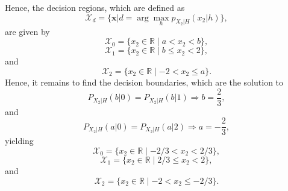 \begin{solution}
    Hence, the decision regions, which are defined as 
  \begin{equation*}
    \mathcal{X}_d = \{\mathbf{x} | d = \arg \mathop{\operatorname{max}}_{h} p_{X_2|H}(x_2|h)\},
  \end{equation*}
  are given by
        \begin{equation*}
          \mathcal{X}_0 = \{x_2 \in \mathbb{R}  \mid a < x_2 < b \},
        \end{equation*}
        \begin{equation*}
          \mathcal{X}_1 = \{x_2 \in \mathbb{R}  \mid b \leq x_2 < 2 \},
        \end{equation*}
        and
        \begin{equation*}
          \mathcal{X}_2 = \{x_2 \in \mathbb{R}  \mid -2 < x_2 \leq a \}.
        \end{equation*}
        Hence, it remains to find the decision boundaries, which are the solution to
        \begin{equation*}
  P_{X_2|H}(b|0) = P_{X_2|H}(b|1) \Rightarrow b = \frac{2}{3},
\end{equation*}
and
\begin{equation*}
  P_{X_2|H}(a|0) = P_{X_2|H}(a|2) \Rightarrow a = -\frac{2}{3},
\end{equation*}
yielding
        \begin{equation*}
          \mathcal{X}_0 = \{x_2  \in \mathbb{R} \mid -2/3 < x_2 < 2/3 \},
        \end{equation*}
        \begin{equation*}
          \mathcal{X}_1 = \{x_2  \in \mathbb{R} \mid 2/3 \leq x_2 < 2 \},
        \end{equation*}
        and
        \begin{equation*}
          \mathcal{X}_2 = \{x_2  \in \mathbb{R} \mid -2 < x_2 \leq -2/3 \}.
        \end{equation*}
        
\end{solution}



